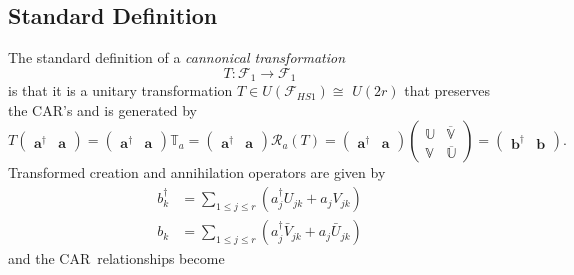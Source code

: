 \documentclass[aps, preprint]{revtex4}
\begin{document}
\subsection{Standard Definition}
The standard definition of a \emph{cannonical transformation}
\begin{equation}T :\mathcal{F}_{1} \rightarrow \mathcal{F}_{1}
\end{equation}is that it is a unitary transformation $T \in U \left (\mathcal{F}_{H S 1}\right ) \cong $ $U \left (2 r\right )$ that preserves the CAR's and is generated by
\begin{equation}T \left (\begin{array}{cc}\mathbf{a}^{ \dag } & \mathbf{a}\end{array}\right ) =\left (\begin{array}{cc}\mathbf{a}^{ \dag } & \mathbf{a}\end{array}\right ) \mathbb{T}_{a} =\left (\begin{array}{cc}\mathbf{a}^{ \dag } & \mathbf{a}\end{array}\right ) \mathcal{R}_{a} \left (T\right ) =\left (\begin{array}{cc}\mathbf{a}^{ \dag } & \mathbf{a}\end{array}\right ) \left (\begin{array}{cc}\mathbb{U} & \overline{\mathbb{V}} \\
\mathbb{V} & \overline{\mathbb{U}}\end{array}\right ) =\left (\begin{array}{cc}\mathbf{b}^{ \dag } & \mathbf{b}\end{array}\right )\text{.}
\end{equation}Transformed creation and annihilation operators are given by
\begin{align}b_{k}^{ \dag } &  =\sum _{1 \leq j \leq r}\left (a_{j}^{ \dag } U_{j k} +a_{j} V_{j k}\right ) \\
b_{k} &  =\sum _{1 \leq j \leq r}\left (a_{j}^{ \dag } \bar{V}_{j k} +a_{j} \bar{U}_{j k}\right )\end{align}and the CAR\ relationships become
\end{document}
